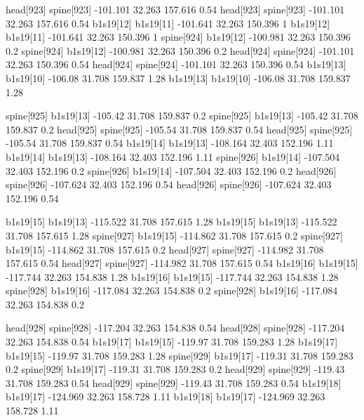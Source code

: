 head[923]    spine[923]    -101.101    32.263    157.616    0.54
head[923]    spine[923]    -101.101    32.263    157.616    0.54
b1s19[12]    b1s19[11]    -101.641    32.263    150.396    1
b1s19[12]    b1s19[11]    -101.641    32.263    150.396    1
spine[924]    b1s19[12]    -100.981    32.263    150.396    0.2
spine[924]    b1s19[12]    -100.981    32.263    150.396    0.2
head[924]    spine[924]    -101.101    32.263    150.396    0.54
head[924]    spine[924]    -101.101    32.263    150.396    0.54
b1s19[13]    b1s19[10]    -106.08    31.708    159.837    1.28
b1s19[13]    b1s19[10]    -106.08    31.708    159.837    1.28


spine[925]    b1s19[13]    -105.42    31.708    159.837    0.2
spine[925]    b1s19[13]    -105.42    31.708    159.837    0.2
head[925]    spine[925]    -105.54    31.708    159.837    0.54
head[925]    spine[925]    -105.54    31.708    159.837    0.54
b1s19[14]    b1s19[13]    -108.164    32.403    152.196    1.11
b1s19[14]    b1s19[13]    -108.164    32.403    152.196    1.11
spine[926]    b1s19[14]    -107.504    32.403    152.196    0.2
spine[926]    b1s19[14]    -107.504    32.403    152.196    0.2
head[926]    spine[926]    -107.624    32.403    152.196    0.54
head[926]    spine[926]    -107.624    32.403    152.196    0.54


b1s19[15]    b1s19[13]    -115.522    31.708    157.615    1.28
b1s19[15]    b1s19[13]    -115.522    31.708    157.615    1.28
spine[927]    b1s19[15]    -114.862    31.708    157.615    0.2
spine[927]    b1s19[15]    -114.862    31.708    157.615    0.2
head[927]    spine[927]    -114.982    31.708    157.615    0.54
head[927]    spine[927]    -114.982    31.708    157.615    0.54
b1s19[16]    b1s19[15]    -117.744    32.263    154.838    1.28
b1s19[16]    b1s19[15]    -117.744    32.263    154.838    1.28
spine[928]    b1s19[16]    -117.084    32.263    154.838    0.2
spine[928]    b1s19[16]    -117.084    32.263    154.838    0.2


head[928]    spine[928]    -117.204    32.263    154.838    0.54
head[928]    spine[928]    -117.204    32.263    154.838    0.54
b1s19[17]    b1s19[15]    -119.97    31.708    159.283    1.28
b1s19[17]    b1s19[15]    -119.97    31.708    159.283    1.28
spine[929]    b1s19[17]    -119.31    31.708    159.283    0.2
spine[929]    b1s19[17]    -119.31    31.708    159.283    0.2
head[929]    spine[929]    -119.43    31.708    159.283    0.54
head[929]    spine[929]    -119.43    31.708    159.283    0.54
b1s19[18]    b1s19[17]    -124.969    32.263    158.728    1.11
b1s19[18]    b1s19[17]    -124.969    32.263    158.728    1.11


